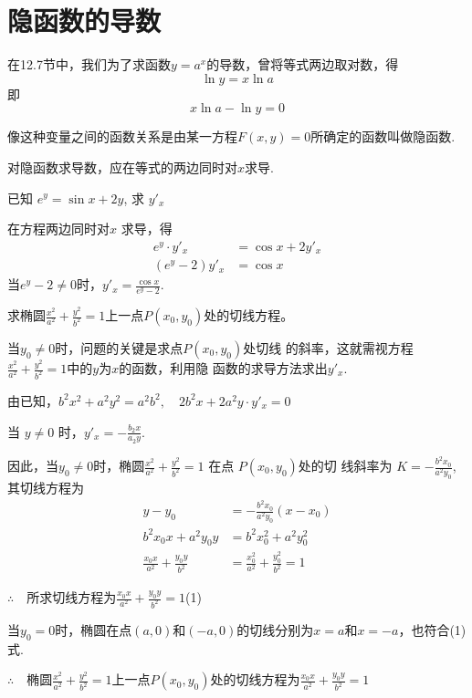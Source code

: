 \section{隐函数的导数}
在12.7节中，我们为了求函数$y=a^x$的导数，曾将等式两边取对数，得
\[\ln y=x\ln a\]
即
\[x\ln a-\ln y=0\]

像这种变量之间的函数关系是由某一方程$F(x,y)=0$所确定的函数叫做隐函数.

对隐函数求导数，应在等式的两边同时对$x$求导.

\begin{example}
    已知 $e^y=\sin x+2y$, 求 $y'_x$
\end{example}

\begin{solution}
    在方程两边同时对$x$ 求导，得
\[\begin{split}
    e^y\cdot y' _x&=\cos x+2y'_x\\
    (e^{y}-2)y'_{x}&=\cos x
\end{split}\]
当$e^{y}- 2\neq 0$时，$y'_{x}=\frac{\cos x}{e^{y}-2}$.
\end{solution}


\begin{example}
    求椭圆$\frac{x^2}{a^2}+\frac{y^2}{b^2}=1$上一点$P(x_0,y_0)$处的切线方程。
\end{example}

\begin{analyze}
    当$y_0\neq0$时，问题的关键是求点$P(x_0,y_0)$处切线
的斜率，这就需视方程$\frac{x^2}{a^2}+\frac{y^2}{b^2}=1$中的$y$为$x$的函数，利用隐
函数的求导方法求出$y'_x$.
\end{analyze}

\begin{solution}
    由已知，$b^2x^2+a^2y^2=a^2b^2,\quad 2b^2x+2a^2y\cdot y'_x=0$

    当 $y\neq0$ 时，$y'_{x}=-\frac{b_{2}x}{a_{2}y}$.

因此，当$y_0\ne 0$时，椭圆$\frac{x^{2}}{a^{2}}+\frac{y^{2}}{b^{2}}=1$ 在点 $P(x_0,y_0)$处的切
线斜率为 $K=-\frac{b^{2}x_{0}}{a^{2}y_{0}}$, 其切线方程为
\[\begin{split}
    y-y_{0}&=-\frac{b^{2}x_{0}}{a^{2}y_{0}}(x-x_{0})\\
    b^2x_0x+a^2y_0y&=b^2 x^2_0+a^2 y^2_0\\
    \frac{x_0x}{a^2}+\frac{y_0y}{b^2}&=\frac{x^2_0}{a^2}+\frac{y^2_0}{b^2}=1
\end{split}\]

$\therefore\quad $所求切线方程为$\frac{x_0x}{a^2}+\frac{y_0y}{b^2}=1$\hfill(1)

当$y_0=0$时，椭圆在点$(a,0)$和$(-a,0)$的切线分别为$x=a$和$x=-a$，也符合(1)式. 

$\therefore\quad $椭圆$\frac{x^2}{a^2}+\frac{y^2}{b^2}=1$上一点$P(x_0,y_0)$处的切线方程为$\frac{x_0x}{a^2}+\frac{y_0y}{b^2}=1$
\end{solution}

